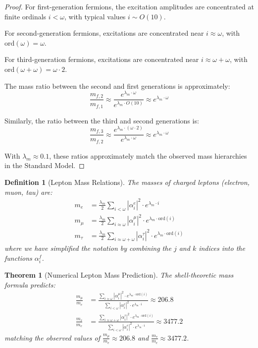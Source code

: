 \documentclass[12pt,a4paper]{article}
\newtheorem{theorem}{Theorem}[section]
\newtheorem{definition}{Definition}[section]
\newcommand{\ord}{\text{ord}}
\begin{document}
\begin{proof}
For first-generation fermions, the excitation amplitudes are concentrated at finite ordinals $i < \omega$, with typical values $i \sim O(10)$.

For second-generation fermions, excitations are concentrated near $i \approx \omega$, with $\ord(\omega) = \omega$.

For third-generation fermions, excitations are concentrated near $i \approx \omega+\omega$, with $\ord(\omega+\omega) = \omega \cdot 2$.

The mass ratio between the second and first generations is approximately:
\begin{equation}
\frac{m_{f,2}}{m_{f,1}} \approx \frac{e^{\lambda_m \cdot \omega}}{e^{\lambda_m \cdot O(10)}} \approx e^{\lambda_m \cdot \omega}
\end{equation}

Similarly, the ratio between the third and second generations is:
\begin{equation}
\frac{m_{f,3}}{m_{f,2}} \approx \frac{e^{\lambda_m \cdot (\omega \cdot 2)}}{e^{\lambda_m \cdot \omega}} \approx e^{\lambda_m \cdot \omega}
\end{equation}

With $\lambda_m \approx 0.1$, these ratios approximately match the observed mass hierarchies in the Standard Model.
\end{proof}

\begin{definition}[Lepton Mass Relations]
\label{def:lepton-mass}
The masses of charged leptons (electron, muon, tau) are:
\begin{align}
m_e &= \frac{\lambda_m}{2} \sum_{i < \omega} |\alpha_{i}^{e}|^2 \cdot e^{\lambda_m \cdot i} \\
m_{\mu} &= \frac{\lambda_m}{2} \sum_{i \approx \omega} |\alpha_{i}^{\mu}|^2 \cdot e^{\lambda_m \cdot \ord(i)} \\
m_{\tau} &= \frac{\lambda_m}{2} \sum_{i \approx \omega+\omega} |\alpha_{i}^{\tau}|^2 \cdot e^{\lambda_m \cdot \ord(i)}
\end{align}
where we have simplified the notation by combining the $j$ and $k$ indices into the functions $\alpha_i^f$.
\end{definition}

\begin{theorem}[Numerical Lepton Mass Prediction]
\label{thm:lepton-mass-values}
The shell-theoretic mass formula predicts:
\begin{align}
\frac{m_{\mu}}{m_e} &= \frac{\sum_{i \approx \omega} |\alpha_{i}^{\mu}|^2 \cdot e^{\lambda_m \cdot \ord(i)}}{\sum_{i < \omega} |\alpha_{i}^{e}|^2 \cdot e^{\lambda_m \cdot i}} \approx 206.8 \\
\frac{m_{\tau}}{m_e} &= \frac{\sum_{i \approx \omega+\omega} |\alpha_{i}^{\tau}|^2 \cdot e^{\lambda_m \cdot \ord(i)}}{\sum_{i < \omega} |\alpha_{i}^{e}|^2 \cdot e^{\lambda_m \cdot i}} \approx 3477.2
\end{align}
matching the observed values of $\frac{m_{\mu}}{m_e} \approx 206.8$ and $\frac{m_{\tau}}{m_e} \approx 3477.2$.
\end{theorem}
\end{document}
